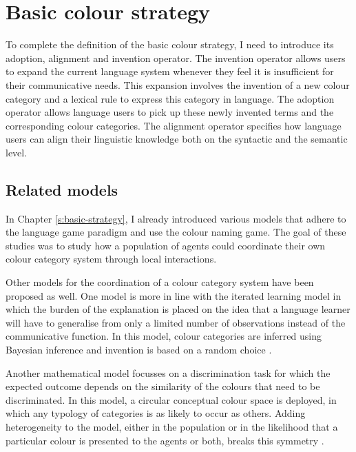 \chapter{Basic colour strategy}
\label{s:basic-operators}

\setcounter{figure}{1}

To complete the definition of the basic colour strategy, I need
to introduce its adoption, alignment and invention operator. The
invention operator allows users to expand the current language system
whenever they feel it is insufficient for their communicative
needs. This expansion involves the invention of a new colour category
and a lexical rule to express this category in language. The adoption
operator allows language users to pick up these newly invented terms
and the corresponding colour categories. The alignment operator
specifies how language users can align their linguistic knowledge both
on the syntactic and the semantic level.

\section{Related models}

In Chapter \ref{s:basic-strategy}, I already introduced various models
\citep{steels05coordinating, belpaeme05explaining, belpaeme07language,
  puglisi08cultural, baronchelli10modeling} that adhere to the
language game paradigm and use the colour naming game. The goal of
these studies was to study how a population of agents could coordinate
their own colour category system through local interactions.

Other models for the coordination of a colour category system have
been proposed as well. One model is more in line with the iterated
learning model \citep{smith03iterated} in which the burden of the
explanation is placed on the idea that a language learner will have to
generalise from only a limited number of observations instead of the
communicative function. In this model, colour categories are inferred
using Bayesian inference and invention is based on a random choice
\citep{dowman07explaining}.

Another mathematical model focusses on a discrimination task for which
the expected outcome depends on the similarity of the colours that
need to be discriminated. In this model, a circular conceptual colour
space is deployed, in which any typology of categories is as likely to
occur as others. Adding heterogeneity to the model, either in the
population or in the likelihood that a particular colour is presented
to the agents or both, breaks this symmetry
\citep{komarova08population}.

